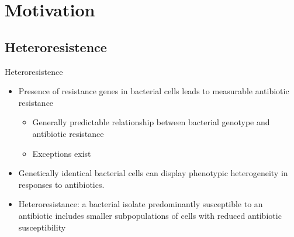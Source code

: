 \documentclass[aspectratio=169,  notheorems, sOuRcEs]{RUCPresentation}
\begin{document}
\section{Motivation}

\subsection{Heteroresistence}

\begin{frame}{Heteroresistence}




    \begin{itemize}[<+->]
        \item Presence of resistance genes in bacterial cells leads
            to measurable antibiotic resistance
            \begin{itemize}[<.->]
                \item Generally predictable relationship between bacterial
                    genotype and antibiotic resistance
                \item Exceptions exist
            \end{itemize}
        \item Genetically identical bacterial cells can display phenotypic
            heterogeneity in responses to antibiotics.
        \item Heteroresistance: a bacterial isolate predominantly
            susceptible to an antibiotic includes smaller subpopulations
            of cells with reduced antibiotic susceptibility
    \end{itemize}

\end{frame}
\end{document}
